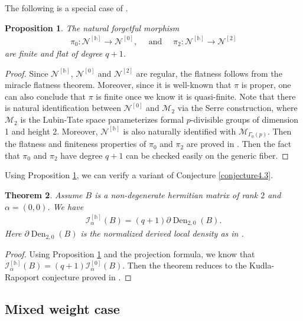 \documentclass[11pt,oneside]{amsart}
\theoremstyle{plain}
\newtheorem{theorem}{Theorem}[section]
\newtheorem{proposition}[theorem]{Proposition}
\theoremstyle{definition}
\theoremstyle{remark}
\newcommand{\CI}{{\mathcal I}}
\newcommand{\cN}{\mathcal{N}}
\newcommand{\cM}{\mathcal{M}}
\numberwithin{equation}{section}
\begin{document}
    The following is a special case of  \cite[Proposition 3.5]{LiMihatsch}.
	\begin{proposition}\label{proposition5.5.1}
		The natural forgetful morphism 
		\begin{align*}
			\pi_0: \cN^{[\mathds{h}]}\to \cN^{[0]}, \quad \text{ and } \quad  \pi_2: \cN^{[\mathds{h}]}\to \cN^{[2]}
		\end{align*}
		are finite and flat of degree $q+1$.
	\end{proposition}
	\begin{proof}
		Since $\cN^{[\mathds{h}]}$, $\cN^{[0]}$ and  $\cN^{[2]}$  are regular,  the flatness follows from the miracle flatness theorem. Moreover, since it is well-known that $\pi$ is proper, one can also conclude that $\pi$ is finite once we know it is quasi-finite. Note that there is natural identification between $\cN^{[0]}$ and $\cM_2$ via the Serre construction, where $\cM_2$ is the Lubin-Tate space parameterizes formal $p$-divisible groups of dimension 1 and height 2. Moreover, $\cN^{[\mathds{h}]}$ is also naturally identified with $\cM_{\Gamma_0(p)}$. Then the flatness and finiteness properties of $\pi_0$ and $\pi_2$ are proved in \cite[Proposition 3.5]{LiMihatsch}.  Then the fact that $\pi_0$ and $\pi_2$ have degree $q+1$ can be checked easily on the generic fiber.
	\end{proof}
	Using Proposition \ref{proposition5.5.1}, we can verify a variant of Conjecture \ref{conjecture4.3}.
	\begin{theorem}Assume $B$ is a non-degenerate hermitian matrix of rank $2$ and $\alpha=(0,0)$. We have
	\begin{align*}
\CI_{\alpha}^{[\mathds{h}]}(B)= (q+1)   
\partial \operatorname{Den}_{2,0}(B).\end{align*}
Here $\partial\operatorname{Den}_{2,0}(B)$ is the normalized derived local density as in \cite{chz}.
	\end{theorem}
    \begin{proof}
      Using Proposition \ref{proposition5.5.1} and the projection formula, we know that $\CI_{\alpha}^{[\mathds{h}]}(B)=(q+1)\CI_{\alpha}^{[0]}(B)$. Then the theorem reduces to the Kudla-Rapoport conjecture proved in \cite{KR1,LZ}.
    \end{proof}


\subsection{Mixed weight case}
        
\end{document}
